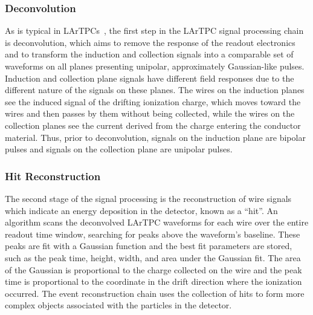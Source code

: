 \documentclass[%
 floatfix,
 reprint,
 twocolumn,
superscriptaddress,
showpacs,preprintnumbers,
 amsmath,amssymb,
 aps,
prd,
]{revtex4-1}
\begin{document}
\subsubsection{Deconvolution}\label{sec:deconv}
As is typical in LArTPCs~\cite{Baller:2017ugz}, the first step in the LArTPC signal processing chain is deconvolution, which aims to remove the response of the readout electronics and to transform the induction and collection signals into a comparable set of waveforms on all planes presenting unipolar, approximately Gaussian-like pulses. Induction and collection plane signals have different field responses due to the different nature of the signals on these planes. The wires on the induction planes see the induced signal of the drifting ionization charge, which moves toward the wires and then passes by them without being collected, while the wires on the collection planes see the current derived from the charge entering the conductor material. Thus, prior to deconvolution, signals on the induction plane are bipolar pulses and signals on the collection plane are unipolar pulses. 

\subsubsection{Hit Reconstruction}\label{sec:HitReco}
The second stage of the signal processing is the reconstruction of wire signals which indicate an energy deposition in the detector, known as a ``hit''.  An algorithm scans the deconvolved LArTPC waveforms for each wire over the entire readout time window, searching for peaks above the waveform's baseline. These peaks are fit with a Gaussian function and the best fit parameters are stored, such as the peak time, height, width, and area under the Gaussian fit. The area of the Gaussian is proportional to the charge collected on the wire and the peak time is proportional to the coordinate in the drift direction where the ionization occurred. The event reconstruction chain uses the collection of hits to form more complex objects associated with the particles in the detector. 

\end{document}
